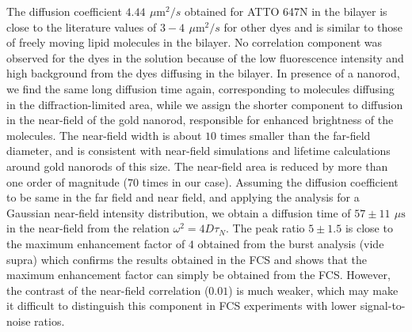 \documentclass[journal=jpccck,manuscript=article]{achemso}
\newcommand{\um}{\ensuremath{\,\mu\textrm{m}}}
\newcommand{\us}{\ensuremath{\,\mu\textrm{s}}}
\begin{document}
The diffusion coefficient $4.44~\um^2/s$ obtained for ATTO 647N in the bilayer is close to the literature values of $3-4~\um^2/s$\cite{mach2010lipid} for other dyes and is similar to those of freely moving lipid molecules in the bilayer. No correlation component was observed for the dyes in the solution because of the low fluorescence intensity and high background from the dyes diffusing in the bilayer. In presence of a nanorod, we find the same long diffusion time again, corresponding to molecules diffusing in the diffraction-limited area, while we assign the shorter component to diffusion in the near-field of the gold nanorod, responsible for enhanced brightness of the molecules. The near-field width is about $10$ times smaller than the far-field diameter, and is consistent with near-field simulations and lifetime calculations around gold nanorods of this size.\cite{khatua2014resonant,seelig2007nanoparticleinduced} The near-field area is reduced by more than one order of magnitude ($70$ times in our case). Assuming the diffusion coefficient to be same in the far field and near field, and applying the analysis for a Gaussian near-field intensity distribution, we obtain a diffusion time of $57\pm11~\us$ in the near-field from the relation $\omega^2=4D\tau_N$. The peak ratio $5\pm1.5$ is close to the maximum enhancement factor of $4$ obtained from the burst analysis (vide supra) which confirms the results obtained in the FCS and shows that the maximum enhancement factor can simply be obtained from the FCS. However, the contrast of the near-field correlation ($0.01$) is much weaker, which may make it difficult to distinguish this component in FCS experiments with lower signal-to-noise ratios.\\
\end{document}

